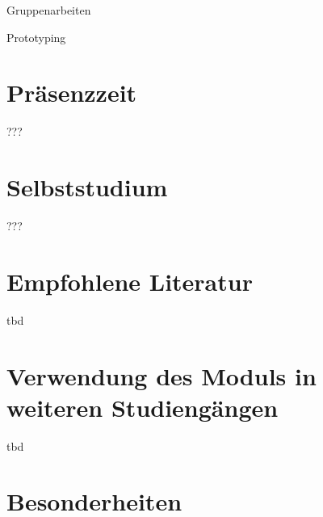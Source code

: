 Gruppenarbeiten

Prototyping

\hypertarget{pruxe4senzzeitpathlabel....srcmodulbeschreibungen-bachelor-bpo5ba_product-dimensions}{%
\section*{Präsenzzeit\label{../../src/modulbeschreibungen-bachelor-bpo5/BA_Product-Dimensions}}\label{pruxe4senzzeitpathlabel....srcmodulbeschreibungen-bachelor-bpo5ba_product-dimensions}}

???

\hypertarget{selbststudiumpathlabel....srcmodulbeschreibungen-bachelor-bpo5ba_product-dimensions}{%
\section*{Selbststudium\label{../../src/modulbeschreibungen-bachelor-bpo5/BA_Product-Dimensions}}\label{selbststudiumpathlabel....srcmodulbeschreibungen-bachelor-bpo5ba_product-dimensions}}

???

\hypertarget{empfohlene-literaturpathlabel....srcmodulbeschreibungen-bachelor-bpo5ba_product-dimensions}{%
\section*{Empfohlene
Literatur\label{../../src/modulbeschreibungen-bachelor-bpo5/BA_Product-Dimensions}}\label{empfohlene-literaturpathlabel....srcmodulbeschreibungen-bachelor-bpo5ba_product-dimensions}}

tbd

\hypertarget{verwendung-des-moduls-in-weiteren-studienguxe4ngenpathlabel....srcmodulbeschreibungen-bachelor-bpo5ba_product-dimensions}{%
\section*{Verwendung des Moduls in weiteren
Studiengängen\label{../../src/modulbeschreibungen-bachelor-bpo5/BA_Product-Dimensions}}\label{verwendung-des-moduls-in-weiteren-studienguxe4ngenpathlabel....srcmodulbeschreibungen-bachelor-bpo5ba_product-dimensions}}

tbd

\hypertarget{besonderheitenpathlabel....srcmodulbeschreibungen-bachelor-bpo5ba_product-dimensions}{%
\section*{Besonderheiten\label{../../src/modulbeschreibungen-bachelor-bpo5/BA_Product-Dimensions}}\label{besonderheitenpathlabel....srcmodulbeschreibungen-bachelor-bpo5ba_product-dimensions}}

